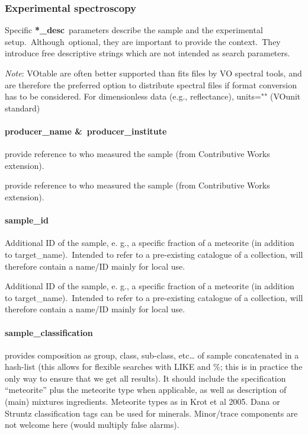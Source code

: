 \documentclass[11pt,a4paper]{ivoa}
\begin{document}
\subsubsection{Experimental spectroscopy\\}

Specific \textbf{*\_desc} parameters describe the sample and the experimental setup. Although optional, they are important to provide the context. They introduce free descriptive strings which are not intended as search parameters.

\emph{Note}: VOtable are often better supported than fits files by VO spectral tools, and are therefore the preferred option to distribute spectral files if format conversion has to be considered. For dimensionless data (e.g., reflectance), units="" (VOunit standard)

\paragraph{producer\_name \& producer\_institute}

provide reference to who measured the sample (from Contributive Works extension).

provide reference to who measured the sample (from Contributive Works extension).

\paragraph{sample\_id}

Additional ID of the sample, e. g., a specific fraction of a meteorite (in addition to target\_name). Intended to refer to a pre-existing catalogue of a collection, will therefore contain a name/ID mainly for local use. 

Additional ID of the sample, e. g., a specific fraction of a meteorite (in addition to target\_name). Intended to refer to a pre-existing catalogue of a collection, will therefore contain a name/ID mainly for local use. 

\paragraph{sample\_classification}

provides composition as group, class, sub-class, etc… of sample concatenated in a hash-list (this allows for flexible searches with LIKE and \%; this is in practice the only way to ensure that we get all results). It should include the specification ``meteorite'' plus the meteorite type when applicable, as well as description of (main) mixtures ingredients. Meteorite types as in Krot et al 2005. Dana or Struntz classification tags can be used for minerals. Minor/trace components are not welcome here (would multiply false alarms).
\end{document}
